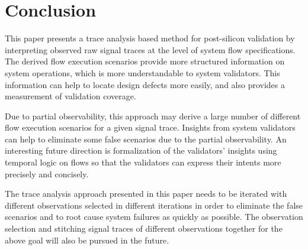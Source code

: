 \documentclass[conference]{IEEEtran}
\begin{document}
%
\section{Conclusion}

This paper presents a trace analysis based method for post-silicon validation by interpreting observed raw signal traces at the level of system flow specifications.  The derived flow execution scenarios provide more structured information on system operations, which is more understandable to system validators.   This information can help to locate design defects more easily, and also provides a measurement of validation coverage.  

Due to partial observability, this approach may derive a large number of different flow execution scenarios for a given signal trace.  Insights from system validators can help to eliminate some false scenarios due to the partial observability.  An interesting future direction is formalization of the validators' insights using temporal logic on flows so that the validators can express their intents more precisely and concisely. 

The trace analysis approach presented in this paper needs to be iterated with different observations selected in different iterations in order to eliminate the false scenarios and to root cause system failures as quickly as possible.  The observation selection and stitching signal traces of different observations together for the above goal will also be pursued in the future.






%
%
%





\end{document}
